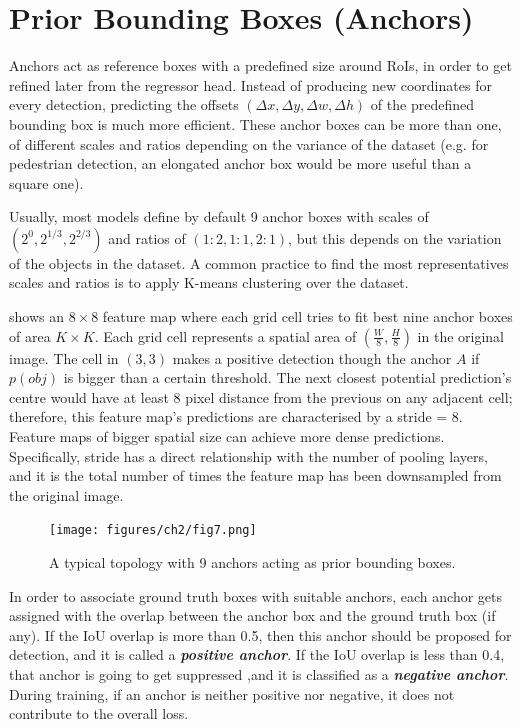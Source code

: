 \section{Prior Bounding Boxes (Anchors)}
Anchors act as reference boxes with a predefined size around RoIs, in order to get refined later from the regressor head. Instead of producing new coordinates for every detection, predicting the offsets $(\Delta x, \Delta y, \Delta w, \Delta h)$ of the predefined bounding box is much more efficient. These anchor boxes can be more than one, of different scales and ratios depending on the variance of the dataset (e.g. for pedestrian detection, an elongated anchor box would be more useful than a square one).

Usually, most models define by default 9 anchor boxes with scales of $(2^0, 2^{1/3}, 2^{2/3})$ and ratios of $(1\!:\!2,1\!:\!1,2\!:\!1)$, but this depends on the variation of the objects in the dataset. A common practice to find the most representatives scales and ratios is to apply K-means clustering over the dataset.

 shows an $8\times8$ feature map where each grid cell tries to fit best nine anchor boxes of area $K\times K$. Each grid cell represents a spatial area of $(\frac{W}{8}, \frac{H}{8})$ in the original image. The cell in $(3,3)$ makes a positive detection though the anchor $A$ if $p(obj)$ is bigger than a certain threshold. The next closest potential prediction's centre would have at least 8 pixel distance from the previous on any adjacent cell; therefore, this feature map's predictions are characterised by a stride = 8. Feature maps of bigger spatial size can achieve more dense predictions. Specifically, stride has a direct relationship with the number of pooling layers, and it is the total number of times the feature map has been downsampled from the original image.

 \begin{figure}[!htb]
  \centering
  \texttt{[image: figures/ch2/fig7.png]}
  \caption{A typical topology with 9 anchors acting as prior bounding boxes.}
  \label{fig7}
\end{figure} 

In order to associate ground truth boxes with suitable anchors, each anchor gets assigned with the overlap between the anchor box and the ground truth box (if any). If the IoU overlap is more than 0.5, then this anchor should be proposed for detection, and it is called a \textbf{\textit{positive anchor}}. If the IoU overlap is less than 0.4, that anchor is going to get suppressed ,and it is classified as a \textbf{\textit{negative anchor}}. During training, if an anchor is neither positive nor negative, it does not contribute to the overall loss.

